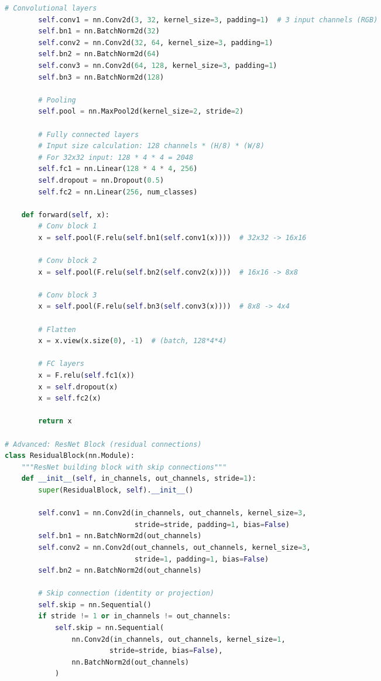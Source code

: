 \documentclass[8pt,landscape]{article}
\begin{document}
\begin{multicols}{3}
\begin{lstlisting}[language=Python]
        # Convolutional layers
        self.conv1 = nn.Conv2d(3, 32, kernel_size=3, padding=1)  # 3 input channels (RGB)
        self.bn1 = nn.BatchNorm2d(32)
        self.conv2 = nn.Conv2d(32, 64, kernel_size=3, padding=1)
        self.bn2 = nn.BatchNorm2d(64)
        self.conv3 = nn.Conv2d(64, 128, kernel_size=3, padding=1)
        self.bn3 = nn.BatchNorm2d(128)

        # Pooling
        self.pool = nn.MaxPool2d(kernel_size=2, stride=2)

        # Fully connected layers
        # Input size calculation: 128 channels * (H/8) * (W/8)
        # For 32x32 input: 128 * 4 * 4 = 2048
        self.fc1 = nn.Linear(128 * 4 * 4, 256)
        self.dropout = nn.Dropout(0.5)
        self.fc2 = nn.Linear(256, num_classes)

    def forward(self, x):
        # Conv block 1
        x = self.pool(F.relu(self.bn1(self.conv1(x))))  # 32x32 -> 16x16

        # Conv block 2
        x = self.pool(F.relu(self.bn2(self.conv2(x))))  # 16x16 -> 8x8

        # Conv block 3
        x = self.pool(F.relu(self.bn3(self.conv3(x))))  # 8x8 -> 4x4

        # Flatten
        x = x.view(x.size(0), -1)  # (batch, 128*4*4)

        # FC layers
        x = F.relu(self.fc1(x))
        x = self.dropout(x)
        x = self.fc2(x)

        return x

# Advanced: ResNet Block (residual connections)
class ResidualBlock(nn.Module):
    """ResNet building block with skip connections"""
    def __init__(self, in_channels, out_channels, stride=1):
        super(ResidualBlock, self).__init__()

        self.conv1 = nn.Conv2d(in_channels, out_channels, kernel_size=3,
                               stride=stride, padding=1, bias=False)
        self.bn1 = nn.BatchNorm2d(out_channels)
        self.conv2 = nn.Conv2d(out_channels, out_channels, kernel_size=3,
                               stride=1, padding=1, bias=False)
        self.bn2 = nn.BatchNorm2d(out_channels)

        # Skip connection (identity or projection)
        self.skip = nn.Sequential()
        if stride != 1 or in_channels != out_channels:
            self.skip = nn.Sequential(
                nn.Conv2d(in_channels, out_channels, kernel_size=1,
                         stride=stride, bias=False),
                nn.BatchNorm2d(out_channels)
            )


\end{lstlisting}
\end{multicols}
\end{document}
